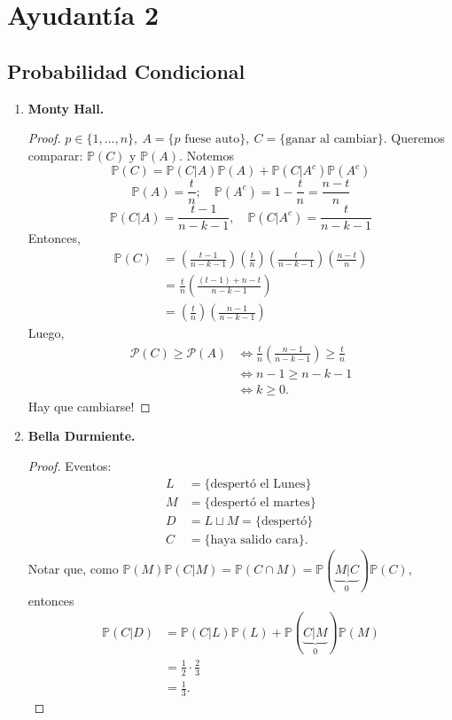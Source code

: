 
\section{Ayudantía 2}
\subsection{Probabilidad Condicional}
\begin{enumerate}
	\item \textbf{Monty Hall.}

	\begin{proof}
		$p\in \{1,\dots,n\},\ A = \{ p \text{ fuese auto}\},\ C = \{ \text{ganar al cambiar} \}$. Queremos comparar: $\mathbb{P}(C)$ y $\mathbb{P}(A)$. Notemos
		\[ \mathbb{P}(C) = \mathbb{P}(C|A)\mathbb{P}(A) + \mathbb{P}(C|A^c)\mathbb{P}(A^c) \]
		\[ \mathbb{P}(A) = \frac{t}{n};\quad \mathbb{P}(A^c) = 1 - \frac{t}{n} = \frac{n-t}{n} \]
		\[ \mathbb{P}(C|A) = \frac{t-1}{n-k-1},\quad \mathbb{P}(C|A^c) = \frac{t}{n-k-1} \]
		Entonces,
		\begin{align*}
			\mathbb{P}(C) & = \left( \frac{t-1}{n-k-1} \right) \left( \frac{t}{n} \right) \left( \frac{t}{n-k-1} \right) \left( \frac{n-t}{n} \right) \\
			& = \frac{t}{n} \left( \frac{(t-1) + n - t}{n-k-1} \right) \\
			& = \left( \frac{t}{n} \right) \left(\frac{n-1}{n-k-1} \right)
		\end{align*}
		Luego,
		\begin{align*}
			\mathcal{P}(C) \geq \mathcal{P}(A) & \iff \frac{t}{n} \left( \frac{n-1}{n-k-1} \right) \geq \frac{t}{n} \\
			& \iff n-1 \geq n-k-1 \\
			& \iff k \geq 0
		.\end{align*}
		Hay que cambiarse!
	\end{proof}

	\item \textbf{Bella Durmiente.}
	\begin{proof}
		Eventos:
		\begin{align*}
			L & = \{\text{despertó el Lunes}\} \\
			M & = \{\text{despertó el martes}\} \\
			D & = L \sqcup M = \{\text{despertó}\} \\
			C & = \{\text{haya salido cara}\}  
		.\end{align*}
		Notar que, como $\mathbb{P}(M)\mathbb{P}(C|M) = \mathbb{P}(C\cap M) = \mathbb{P}(\underbrace{M|C}_{0})\mathbb{P}(C)$, entonces
		\begin{align*}
			\mathbb{P}(C|D) & = \mathbb{P}(C|L)\mathbb{P}(L) + \mathbb{P}(\underbrace{C|M}_{0})\mathbb{P}(M) \\
			& = \frac{1}{2} \cdot \frac{2}{3} \\
			& = \frac{1}{3}
		.\end{align*}
	\end{proof}
\end{enumerate}

